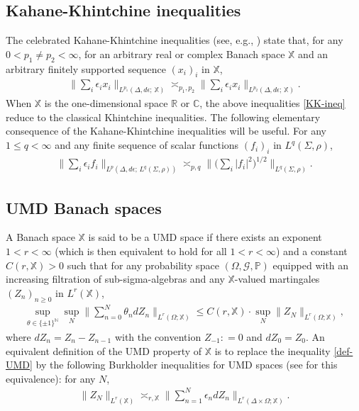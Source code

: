 \documentclass[12pt]{amsart}
\theoremstyle{definition}
\theoremstyle{remark}
\newcommand{\R}{\mathbb{R}}
\newcommand{\N}{\mathbb{N}}
\newcommand{\C}{\mathbb{C}}
\newcommand{\PP}{\mathbb{P}}
\newcommand{\fX}{\mathbb{X}}
\numberwithin{equation}{section}
\begin{document}
 \subsection{Kahane-Khintchine inequalities}  
 
 The celebrated Kahane-Khintchine inequalities (see, e.g., \cite[Theorem 5.2, p.154]{Pisier-book}) state that, for any $0< p_1 \neq p_2<\infty$,  for an arbitrary real or complex Banach space $\fX$ and an arbitrary  finitely supported sequence $(x_i)_{i}$ in $\fX$, 
 \begin{align}\label{KK-ineq}
\big \| \sum_i \epsilon_i x_i\big \|_{L^{p_1}(\Delta, d\epsilon; \, \fX)} \asymp_{p_1, p_2} \big \| \sum_i \epsilon_i x_i\big \|_{L^{p_2}(\Delta, d\epsilon; \, \fX)}.
 \end{align}
  When $\fX$ is the one-dimensional space $\R$ or $\C$, the above inequalities \eqref{KK-ineq} reduce to the  classical Khintchine inequalities. 
 The following elementary consequence of the Kahane-Khintchine inequalities  will be useful.   For any $1\le  q<\infty$ and any finite  sequence of scalar functions $(f_i)_i$ in  $L^q(\Sigma, \rho)$, 
\begin{align}\label{LpLq-abs}
\Big\| \sum_i \epsilon_i f_i\Big\|_{L^p(\Delta, d\epsilon; \, L^q(\Sigma, \rho))} \asymp_{p,q}    \Big\| \Big(\sum_i  | f_i|^2\Big)^{1/2}\Big\|_{L^q(\Sigma, \rho)}.
\end{align}








\subsection{UMD Banach spaces}


A Banach space $\fX$ is said to be a UMD space if there exists an exponent $1<r<\infty$  (which is then equivalent to hold for all $1<r<\infty$)  and a constant $C(r, \fX)>0$ such that  for any probability space $(\Omega,  \mathscr{G}, \PP)$ equipped with an increasing filtration  of sub-sigma-algebras and  any $\fX$-valued martingales $(Z_n)_{n\ge 0}$ in $L^r(\fX)$, 
\begin{align}\label{def-UMD}
\sup_{\theta \in \{\pm 1\}^\N}    \sup_N\Big\|\sum_{n = 0}^N    \theta_n  dZ_n  \Big\|_{L^r(\Omega; \fX)} \le C(r, \fX)   \cdot \sup_N\|Z_N\|_{L^r(\Omega; \fX)},
\end{align}
where $dZ_n= Z_n-Z_{n-1}$ with the convention $Z_{-1}: =0$ and $dZ_0=Z_0$.   An equivalent definition of the UMD property of $\fX$ is to replace the inequality \eqref{def-UMD} by the following  Burkholder inequalities for UMD spaces (see \cite[Theorem 5.2 and Proposition 5.10]{Pisier-book} for this equivalence): for any $N$, 
\begin{align}\label{burk-ineq}
\| Z_N\|_{L^r(\fX)} \asymp_{r, \fX}  \Big\|\sum_{n = 1}^N    \epsilon_n  dZ_n  \Big\|_{L^r(\Delta \times \Omega; \fX)}.
\end{align}
\end{document}
